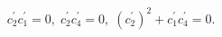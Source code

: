 \begin{equation}
c_{2}^{\prime }c_{1}^{\prime }=0,\;c_{2}^{\prime }c_{4}^{\prime }=0,\;\left(
c_{2}^{\prime }\right) ^{2}+c_{1}^{\prime }c_{4}^{\prime }=0.  \label{bf85}
\end{equation}

